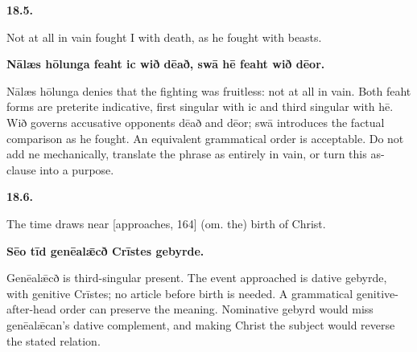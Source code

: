 \par\begin{minipage}{\linewidth}\raggedright
\textbf{18.5.}

Not at all in vain fought I with death, as he fought with beasts.

\textbf{Nālæs hōlunga feaht ic wið dēað, swā hē feaht wið dēor.}

Nālæs hōlunga denies that the fighting was fruitless: not at all in vain. Both feaht forms are preterite indicative, first singular with ic and third singular with hē. Wið governs accusative opponents dēað and dēor; swā introduces the factual comparison as he fought. An equivalent grammatical order is acceptable. Do not add ne mechanically, translate the phrase as entirely in vain, or turn this as-clause into a purpose.

\end{minipage}\par\addvspace{4pt}

\par\begin{minipage}{\linewidth}\raggedright
\textbf{18.6.}

The time draws near [approaches, 164] (om. the) birth of Christ.

\textbf{Sēo tīd genēalǣcð Crīstes gebyrde.}

Genēalǣcð is third-singular present. The event approached is dative gebyrde, with genitive Crīstes; no article before birth is needed. A grammatical genitive-after-head order can preserve the meaning. Nominative gebyrd would miss genēalǣcan's dative complement, and making Christ the subject would reverse the stated relation.

\end{minipage}\par\addvspace{4pt}

